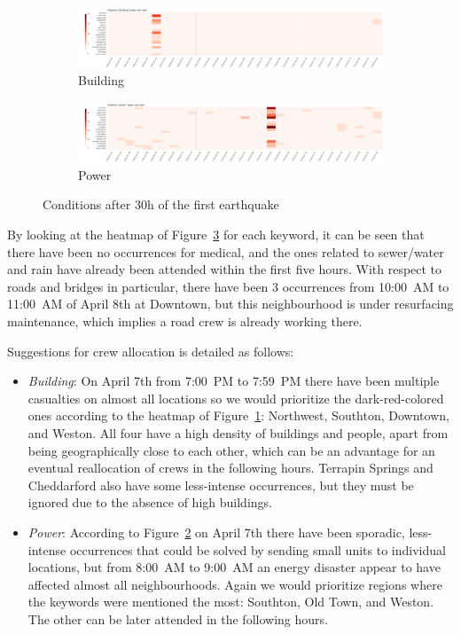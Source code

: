 \begin{figure}[!h]
\begin{subfigure}[!h]{0.98\textwidth}
        \includegraphics[width=1.00\textwidth]{figs/cond_30h/cond_30h_build.png}
        \caption{Building}
        \label{fig:building_30h}
    \end{subfigure}
    \begin{subfigure}[!h]{0.98\textwidth}
        \centering
        \includegraphics[width=1.00\textwidth]{figs/cond_30h/cond_30h_power.png}
        \caption{Power}
        \label{fig:power_30h}
    \end{subfigure}
    \caption{Conditions after 30h of the first earthquake}
    \label{fig:eq_cond_30h}
\end{figure}

By looking at the heatmap of Figure~\ref{fig:eq_cond_30h} for each keyword, it
can be seen that there have been no occurrences for medical, and the ones
related to sewer/water and rain have already been attended within the first five
hours. With respect to roads and bridges in particular, there have been 3
occurrences from 10:00~AM to 11:00~AM of April 8th at Downtown, but this
neighbourhood is under resurfacing maintenance, which implies a road crew is
already working there.

Suggestions for crew allocation is detailed as follows:

\begin{itemize}
    \item \emph{Building}: On April 7th from 7:00~PM to 7:59~PM there have been
    multiple casualties on almost all locations so we would prioritize the
    dark-red-colored ones according to the heatmap of
    Figure~\ref{fig:building_30h}:
    Northwest, Southton, Downtown, and Weston. All four have a high 
    density of buildings and people, apart from being geographically close to
    each other, which can be an advantage for an eventual reallocation of crews
    in the following hours. Terrapin Springs and Cheddarford also have some
    less-intense occurrences, but they must be ignored due to the absence of
    high buildings.
    \item \emph{Power}: According to Figure~\ref{fig:power_30h} on April 7th 
    there have been sporadic, less-intense
    occurrences that could be solved by sending small units to individual
    locations, but from 8:00~AM to 9:00~AM an energy disaster appear to have
    affected almost all neighbourhoods. Again we would prioritize regions where
    the keywords were mentioned the most: Southton, Old Town, and Weston. The
    other can be later attended in the following hours.
\end{itemize}

